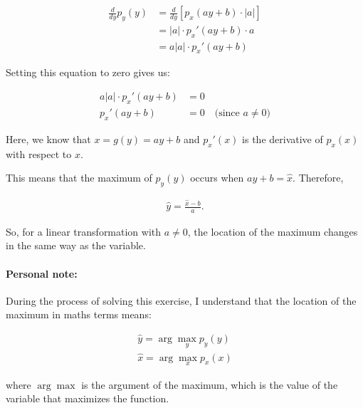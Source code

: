 \documentclass{article}
\begin{document}
\begin{tcolorbox}[breakable,colback=gray!5,colframe=gray!60,title=Solution]
\begin{align*}
  \frac{d}{dy} p_y(y) &= \frac{d}{dy} \left[ p_x(ay + b) \cdot |a| \right] \\
  &= |a| \cdot p_x'(ay + b) \cdot a \\
  &= a|a| \cdot p_x'(ay + b)
\end{align*}


Setting this equation to zero gives us:

\begin{align*}
  a|a| \cdot p_x'(ay + b) &= 0 \\
  p_x'(ay + b) &= 0 \quad \text{(since $a \neq 0$)}
\end{align*}

Here, we know that $x = g(y) = ay + b$ and $p_x'(x)$ is the derivative of $p_x(x)$ with respect to $x$.

This means that the maximum of $p_y(y)$ occurs when $ay + b = \hat{x}$. Therefore,

\begin{align*}
  \hat{y} = \frac{\hat{x} - b}{a}.
\end{align*}

So, for a linear transformation with $a \neq 0$, the location of the maximum changes in the same way as the variable.
\par\medskip

\paragraph{Personal note:} During the process of solving this exercise, 
I understand that the location of the maximum in maths terms means:

\begin{align*}
  \hat{y} = \arg\max_y p_y(y) \\
  \hat{x} = \arg\max_x p_x(x)
\end{align*}

where $\arg\max$ is the argument of the maximum, which is the value of the variable that maximizes the function.
\end{tcolorbox}
\end{document}
